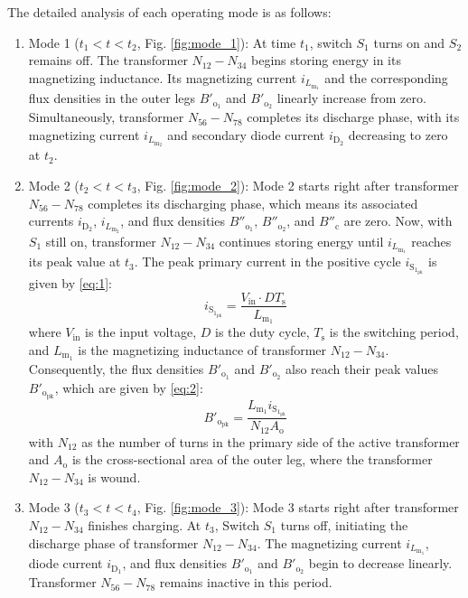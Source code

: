\documentclass[lettersize,journal]{IEEEtran}
\begin{document}
The detailed analysis of each operating mode is as follows:


\begin{enumerate}
    \item Mode 1 ($t_1 < t < t_2$, Fig. \ref{fig:mode_1}): At time $t_1$, switch $S_1$ turns on and $S_2$ remains off. The transformer $N_{12}-N_{34}$ begins storing energy in its magnetizing inductance. Its magnetizing current $i_{L_{\mathrm{m}_1}}$ and the corresponding flux densities in the outer legs $B'_{\mathrm{o}_1}$ and $B'_{\mathrm{o}_2}$ linearly increase from zero. Simultaneously, transformer $N_{56}-N_{78}$ completes its discharge phase, with its magnetizing current $i_{L_{\mathrm{m}_2}}$ and secondary diode current $i_{\mathrm{D}_2}$ decreasing to zero at $t_2$.

    \item Mode 2 ($t_2 < t < t_3$, Fig. \ref{fig:mode_2}): Mode 2 starts right after transformer $N_{56}-N_{78}$ completes its discharging phase, which means its associated currents $i_{\mathrm{D}_2}$, $i_{L_{\mathrm{m}_2}}$, and flux densities $B''_{\mathrm{o}_1}$, $B''_{\mathrm{o}_2}$, and $B''_{\mathrm{c}}$ are zero. Now, with $S_1$ still on, transformer $N_{12}-N_{34}$ continues storing energy until $i_{L_{\mathrm{m}_1}}$ reaches its peak value at $t_3$. The peak primary current in the positive cycle $i_{\mathrm{S}_{1_{\mathrm{pk}}}}$ is given by \eqref{eq:1}:
    \begin{equation}
    \label{eq:1}
    i_{\mathrm{S}_{1_{\mathrm{pk}}}} = \frac{V_{\mathrm{in}} \cdot DT_{\mathrm{s}}}{L_{\mathrm{m}_1}}
    \end{equation}
    where $V_{\mathrm{in}}$ is the input voltage, $D$ is the duty cycle, $T_{\mathrm{s}}$ is the switching period, and $L_{\mathrm{m}_1}$ is the magnetizing inductance of transformer $N_{12}-N_{34}$. Consequently, the flux densities $B'_{\mathrm{o}_1}$ and $B'_{\mathrm{o}_2}$ also reach their peak values $B'_{\mathrm{o}_{\mathrm{pk}}}$, which are given by \eqref{eq:2}:
    \begin{equation}
    \label{eq:2}
    B'_{\mathrm{o}_{\mathrm{pk}}} = \frac{L_{\mathrm{m}_1} i_{\mathrm{S}_{1_{\mathrm{pk}}}}}{N_{12} A_{\mathrm{o}}}
    \end{equation}
    with $N_{12}$ as the number of turns in the primary side of the active transformer and $A_{\mathrm{o}}$ is the cross-sectional area of the outer leg, where the transformer $N_{12}-N_{34}$ is wound.

    \item Mode 3 ($t_3 < t < t_4$, Fig. \ref{fig:mode_3}): Mode 3 starts right after transformer $N_{12}-N_{34}$ finishes charging. At $t_3$, Switch $S_1$ turns off, initiating the discharge phase of transformer $N_{12}-N_{34}$. The magnetizing current $i_{L_{\mathrm{m}_1}}$, diode current $i_{\mathrm{D}_1}$, and flux densities $B'_{\mathrm{o}_1}$ and $B'_{\mathrm{o}_2}$ begin to decrease linearly. Transformer $N_{56}-N_{78}$ remains inactive in this period.
\end{enumerate}
\end{document}
